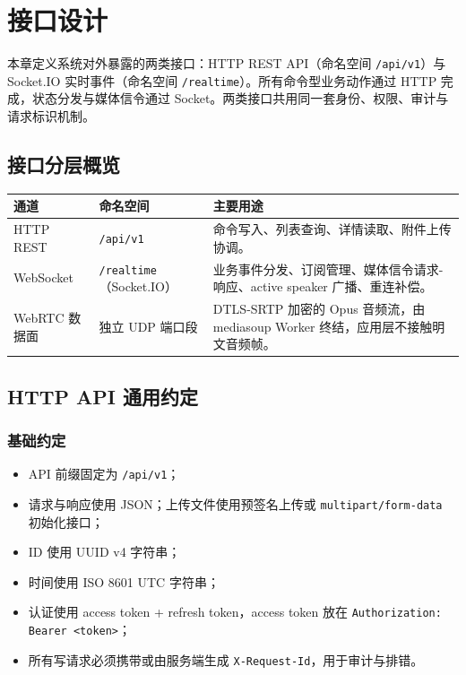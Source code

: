\section{接口设计}

本章定义系统对外暴露的两类接口：HTTP REST API（命名空间 \texttt{/api/v1}）与 Socket.IO 实时事件（命名空间 \texttt{/realtime}）。所有命令型业务动作通过 HTTP 完成，状态分发与媒体信令通过 Socket。两类接口共用同一套身份、权限、审计与请求标识机制。

\subsection{接口分层概览}

\noindent\begin{tabularx}{\textwidth}{L{3.4cm}L{3.6cm}Y}
  \toprule
  通道 & 命名空间 & 主要用途 \\
  \midrule
  HTTP REST & \texttt{/api/v1} & 命令写入、列表查询、详情读取、附件上传协调。 \\
  WebSocket & \texttt{/realtime}（Socket.IO） & 业务事件分发、订阅管理、媒体信令请求-响应、active speaker 广播、重连补偿。 \\
  WebRTC 数据面 & 独立 UDP 端口段 & DTLS-SRTP 加密的 Opus 音频流，由 mediasoup Worker 终结，应用层不接触明文音频帧。 \\
  \bottomrule
\end{tabularx}

\subsection{HTTP API 通用约定}

\subsubsection{基础约定}
\begin{itemize}
  \item API 前缀固定为 \texttt{/api/v1}；
  \item 请求与响应使用 JSON；上传文件使用预签名上传或 \texttt{multipart/form-data} 初始化接口；
  \item ID 使用 UUID v4 字符串；
  \item 时间使用 ISO 8601 UTC 字符串；
  \item 认证使用 access token + refresh token，access token 放在 \texttt{Authorization: Bearer <token>}；
  \item 所有写请求必须携带或由服务端生成 \texttt{X-Request-Id}，用于审计与排错。
\end{itemize}


